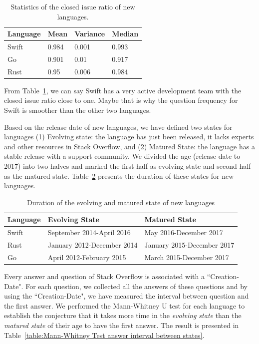 \begin{table}[]

\begin{tabular}{|l|l|l|l|}
\hline
 Language& Mean& Variance& Median\\ \hline
 Swift &  0.984  & 0.001 & 0.993 \\ \hline
 Go    &  0.901  & 0.01  & 0.917 \\ \hline
 Rust  &  0.95   & 0.006 & 0.984 \\ \hline

\end{tabular}%

\caption{Statistics of the closed issue ratio of new  languages.}
\label{table:Issue ratio}
\end{table}
From Table~\ref{table:Issue ratio}, we can say Swift has a very active development team with the closed issue ratio close to one. Maybe that is why the question frequency for Swift is smoother than the other two languages.
\fi

Based on the release date of new languages, we have defined two states for languages (1) Evolving state: the language has just been released, it lacks experts and other resources in Stack Overflow, and (2) Matured State: the language has a stable release with a support community. We divided the age (release date to 2017) into two halves and marked the first half as evolving state and second half as the matured state. Table~\ref{table:States of languages} presents the duration of these states for new languages.
\begin{table}
\caption{Duration of the evolving and matured state of new languages}
\begin{tabular}{|l|l|l|}
\hline
 Language & Evolving State& Matured State \\ \hline
 Swift & September 2014-April 2016 & May 2016-December 2017  \\ \hline
 Rust & January 2012-December 2014 & January 2015-December 2017 \\ \hline
 Go & April 2012-February 2015 & March 2015-December 2017 \\ \hline
\end{tabular}%
\label{table:States of languages}
\end{table}
Every answer and question of Stack Overflow is associated with a ``Creation-Date". For each question, we collected all the answers of these questions and by using the ``Creation-Date", we have measured the interval between question and the first answer.
We performed the Mann-Whitney U test for each language to establish the conjecture that it takes more time in the \emph{evolving state} than the \emph{matured state} of their age to have the first answer. The result is presented in Table~\ref{table:Mann-Whitney Test answer interval between states}.


